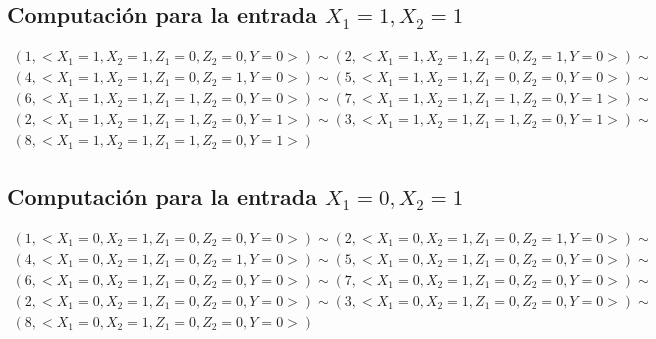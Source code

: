 \documentclass[a4paper]{article}
\begin{document}
		\subsection{Computación para la entrada $X_1=1, X_2=1$}
		\begin{equation*}\begin{gathered}
		(1, <X_1=1, X_2=1, Z_1=0, Z_2=0, Y=0>) \sim (2, <X_1=1, X_2=1, Z_1=0, Z_2=1, Y=0>) \sim\\
		(4, <X_1=1, X_2=1, Z_1=0, Z_2=1, Y=0>) \sim	(5, <X_1=1, X_2=1, Z_1=0, Z_2=0, Y=0>) \sim\\
		(6, <X_1=1, X_2=1, Z_1=1, Z_2=0, Y=0>) \sim (7, <X_1=1, X_2=1, Z_1=1, Z_2=0, Y=1>) \sim\\
		(2, <X_1=1, X_2=1, Z_1=1, Z_2=0, Y=1>) \sim (3, <X_1=1, X_2=1, Z_1=1, Z_2=0, Y=1>) \sim\\
		(8, <X_1=1, X_2=1, Z_1=1, Z_2=0, Y=1>)
		\end{gathered}\end{equation*}
		\subsection{Computación para la entrada $X_1=0, X_2=1$}
		\begin{equation*}\begin{gathered}
		(1, <X_1=0, X_2=1, Z_1=0, Z_2=0, Y=0>) \sim (2, <X_1=0, X_2=1, Z_1=0, Z_2=1, Y=0>) \sim\\
		(4, <X_1=0, X_2=1, Z_1=0, Z_2=1, Y=0>) \sim	(5, <X_1=0, X_2=1, Z_1=0, Z_2=0, Y=0>) \sim\\
		(6, <X_1=0, X_2=1, Z_1=0, Z_2=0, Y=0>) \sim (7, <X_1=0, X_2=1, Z_1=0, Z_2=0, Y=0>) \sim\\
		(2, <X_1=0, X_2=1, Z_1=0, Z_2=0, Y=0>) \sim (3, <X_1=0, X_2=1, Z_1=0, Z_2=0, Y=0>) \sim\\
		(8, <X_1=0, X_2=1, Z_1=0, Z_2=0, Y=0>)
		\end{gathered}\end{equation*}
\end{document}
